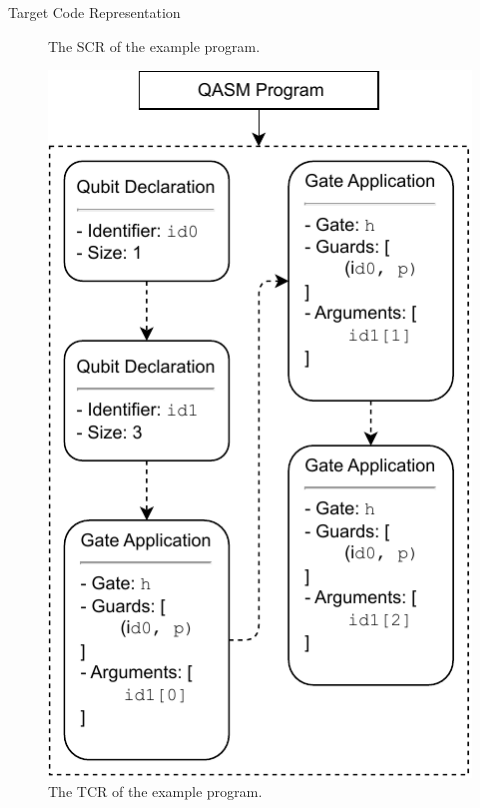 \begin{frame}{Target Code Representation}
\begin{minipage}{.32\textwidth}
\begin{figure}[htp]
            \caption{The SCR of the example program.}
        \end{figure}
    \end{minipage}
    \hfill
    \begin{minipage}{.28\textwidth}
        \centering
        \begin{figure}[htp]
            \centering
            \includegraphics[width=\textwidth]{../figures/drawio/slides/codeGen_targetCode_example.pdf}
            \caption{The TCR of the example program.}
        \end{figure}
    \end{minipage}
\end{frame}

